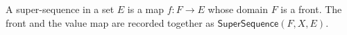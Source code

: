 \begin{definition}
A super-sequence in a set $E$ is a map $f:F\to E$ whose domain $F$ is a
front.  The front and the value map are recorded together as
$\mathsf{SuperSequence}(F,X,E)$.
\end{definition}

